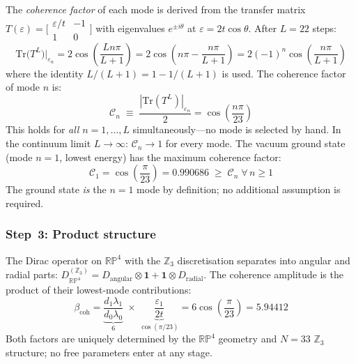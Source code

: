 \documentclass[12pt,a4paper]{article}
\begin{document}
The \emph{coherence factor} of each mode is derived from the transfer matrix
$T(\varepsilon) = \bigl[\begin{smallmatrix}\varepsilon/t & -1 \\ 1 & 0\end{smallmatrix}\bigr]$
with eigenvalues $e^{\pm i\theta}$ at $\varepsilon = 2t\cos\theta$. After $L=22$ steps:
\begin{equation}
  \mathrm{Tr}\bigl(T^L\bigr)\big|_{\varepsilon_n}
  = 2\cos\!\left(\frac{Ln\pi}{L+1}\right)
  = 2\cos\!\left(n\pi - \frac{n\pi}{L+1}\right)
  = 2(-1)^n\cos\!\left(\frac{n\pi}{L+1}\right)
  \label{eq:trace_TL}
\end{equation}
where the identity $L/(L+1)=1-1/(L+1)$ is used. The coherence factor of mode $n$ is:
\begin{equation}
  \mathcal{C}_n \;\equiv\; \frac{|\mathrm{Tr}(T^L)|_{\varepsilon_n}}{2}
  = \cos\!\left(\frac{n\pi}{23}\right)
  \label{eq:coh_factor}
\end{equation}
This holds for \emph{all} $n=1,\ldots,L$ simultaneously---no mode is selected by hand.
In the continuum limit $L\to\infty$: $\mathcal{C}_n\to 1$ for every mode.
The vacuum ground state (mode $n=1$, lowest energy) has the maximum coherence factor:
\begin{equation}
  \mathcal{C}_1 = \cos\!\left(\frac{\pi}{23}\right) = 0.990686
  \;\geq\; \mathcal{C}_n \;\forall\, n\geq 1
  \label{eq:coh_max}
\end{equation}
The ground state \emph{is} the $n=1$ mode by definition; no additional assumption is required.

\subsubsection*{Step~3: Product structure}

The Dirac operator on $\mathbb{RP}^4$ with the $\mathbb{Z}_3$ discretisation
separates into angular and radial parts:
$D_{\mathbb{RP}^4}^{(\mathbb{Z}_3)} = D_\mathrm{angular}\otimes\mathbf{1}
+ \mathbf{1}\otimes D_\mathrm{radial}$.
The coherence amplitude is the product of their lowest-mode contributions:
\begin{equation}
  \boxed{
  \beta_\mathrm{coh}
  = \underbrace{\frac{d_1\lambda_1}{d_0\lambda_0}}_{\displaystyle 6}
  \;\times\;
  \underbrace{\frac{\varepsilon_1}{2t}}_{\displaystyle\cos(\pi/23)}
  = 6\cos\!\left(\frac{\pi}{23}\right) = 5.94412}
  \label{eq:bcoh_final}
\end{equation}
Both factors are uniquely determined by the $\mathbb{RP}^4$ geometry and $N=33$
$\mathbb{Z}_3$ structure; no free parameters enter at any stage.
\end{document}

